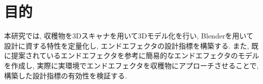 \section{目的}
本研究では, 収穫物を3Dスキャナを用いて3Dモデル化を行い, Blenderを用いて設計に資する特性を定量化し, エンドエフェクタの設計指標を構築する.
また, 既に提案されているエンドエフェクタを参考に簡易的なエンドエフェクタのモデルを作成し, 実際に実環境でエンドエフェクタを収穫物にアプローチさせることで, 構築した設計指標の有効性を検証する.
